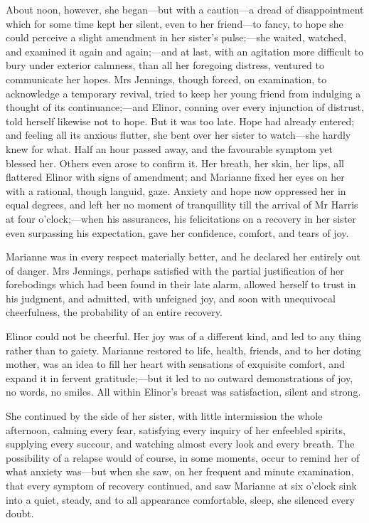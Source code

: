 About noon, however, she began—but with a caution—a dread of disappointment which for some time kept her silent, even to her friend—to fancy, to hope she could perceive a slight amendment in her sister’s pulse;—she waited, watched, and examined it again and again;—and at last, with an agitation more difficult to bury under exterior calmness, than all her foregoing distress, ventured to communicate her hopes. Mrs Jennings, though forced, on examination, to acknowledge a temporary revival, tried to keep her young friend from indulging a thought of its continuance;—and Elinor, conning over every injunction of distrust, told herself likewise not to hope. But it was too late. Hope had already entered; and feeling all its anxious flutter, she bent over her sister to watch—she hardly knew for what. Half an hour passed away, and the favourable symptom yet blessed her. Others even arose to confirm it. Her breath, her skin, her lips, all flattered Elinor with signs of amendment; and Marianne fixed her eyes on her with a rational, though languid, gaze. Anxiety and hope now oppressed her in equal degrees, and left her no moment of tranquillity till the arrival of Mr Harris at four o’clock;—when his assurances, his felicitations on a recovery in her sister even surpassing his expectation, gave her confidence, comfort, and tears of joy.

Marianne was in every respect materially better, and he declared her entirely out of danger. Mrs Jennings, perhaps satisfied with the partial justification of her forebodings which had been found in their late alarm, allowed herself to trust in his judgment, and admitted, with unfeigned joy, and soon with unequivocal cheerfulness, the probability of an entire recovery.

Elinor could not be cheerful. Her joy was of a different kind, and led to any thing rather than to gaiety. Marianne restored to life, health, friends, and to her doting mother, was an idea to fill her heart with sensations of exquisite comfort, and expand it in fervent gratitude;—but it led to no outward demonstrations of joy, no words, no smiles. All within Elinor’s breast was satisfaction, silent and strong.

She continued by the side of her sister, with little intermission the whole afternoon, calming every fear, satisfying every inquiry of her enfeebled spirits, supplying every succour, and watching almost every look and every breath. The possibility of a relapse would of course, in some moments, occur to remind her of what anxiety was—but when she saw, on her frequent and minute examination, that every symptom of recovery continued, and saw Marianne at six o’clock sink into a quiet, steady, and to all appearance comfortable, sleep, she silenced every doubt.

